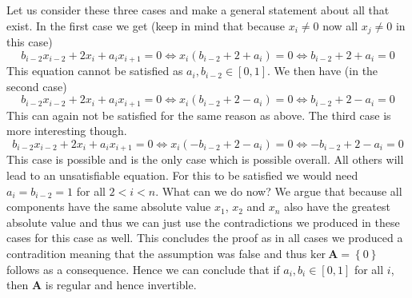 \documentclass{article}
\begin{document}
Let us consider these three cases and make a general statement about all that exist. In the first case we get (keep in mind that because $x_{i} \neq 0$ now all $x_{j} \neq 0$ in this case)
\begin{equation*}
    b_{i-2}x_{i-2} + 2x_{i} + a_{i}x_{i+1} = 0\Longleftrightarrow x_{i}\left(b_{i-2} + 2 + a_{i}\right) = 0\Longleftrightarrow b_{i-2} + 2 + a_{i} = 0 
\end{equation*}
This equation cannot be satisfied as $a_{i}, b_{i-2} \in \left[0,1\right]$. We then have (in the second case)
\begin{equation*}
   b_{i-2}x_{i-2} + 2x_{i} + a_{i}x_{i+1} = 0\Longleftrightarrow x_{i}\left(b_{i-2} + 2 - a_{i}\right) = 0\Longleftrightarrow b_{i-2} + 2 - a_{i} = 0  
\end{equation*}
This can again not be satisfied for the same reason as above. The third case is more interesting though. 
\begin{equation*}
    b_{i-2}x_{i-2} + 2x_{i} + a_{i}x_{i+1} = 0\Longleftrightarrow x_{i}\left(-b_{i-2} + 2 - a_{i}\right) = 0\Longleftrightarrow -b_{i-2} + 2 - a_{i} = 0 
\end{equation*}
This case is possible and is the only case which is possible overall. All others will lead to an unsatisfiable equation. For this to be satisfied we would need $a_{i} = b_{i-2} = 1$ for all $2 < i < n$. What can we do now? We argue that because all components have the same absolute value $x_{1}$, $x_{2}$ and $x_{n}$ also have the greatest absolute value and thus we can just use the contradictions we produced in these cases for this case as well. This concludes the proof as in all cases we produced a contradition meaning that the assumption was false and thus $\text{ker}\:\mathbf{A} = \left\{0\right\}$ follows as a consequence. Hence we can conclude that if $a_{i}, b_{i} \in \left[0,1\right]$ for all $i$, then $\mathbf{A}$ is regular and hence invertible.
\end{document}
